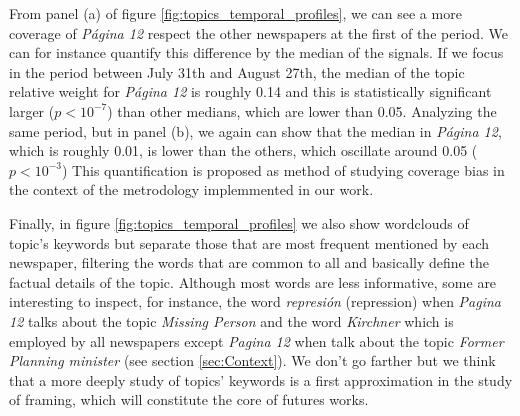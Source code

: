 \par From panel (a) of figure \ref{fig:topics_temporal_profiles}, we can see a more coverage of \emph{Página 12} respect the other newspapers at the first of the period. We can for instance quantify this difference by the median of the signals. If we focus in the period between July 31th and August 27th, the median of the topic relative weight for \emph{Página 12} is roughly 0.14 and this is statistically significant larger ($p < 10^{-7}$) than other medians, which are lower than 0.05.
Analyzing the same period, but in panel (b), we again can show that the median in \emph{Página 12}, which is roughly 0.01, is lower than the others, which oscillate around 0.05 ($p<10^{-3}$)
This quantification is proposed as method of studying coverage bias in the context of the metrodology implemmented in our work. 

\par Finally, in figure \ref{fig:topics_temporal_profiles} we also show wordclouds of topic's keywords but separate those that are most frequent mentioned by each newspaper, filtering the words that are common to all and basically define the factual details of the topic.
Although most words are less informative, some are interesting to inspect, for instance, the word \emph{represión} (repression) when \emph{Pagina 12} talks about the topic \emph{Missing Person} and the word \emph{Kirchner} which is employed by all newspapers except \emph{Pagina 12} when talk about the topic \emph{Former Planning minister} (see section \ref{sec:Context}).
We don't go farther but we think that a more deeply study of topics' keywords is a first approximation in the study of framing, which will constitute the core of futures works.
